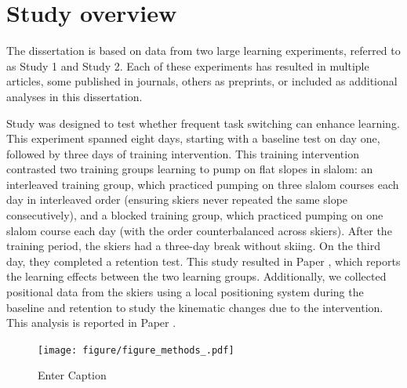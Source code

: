 \newcommand{\RNum}[1]{\uppercase\expandafter{\romannumeral #1\relax}}

\section{Study overview}
The dissertation is based on data from two large learning experiments, referred to as Study 1 and Study 2. Each of these experiments has resulted in multiple articles, some published in journals, others as preprints, or included as additional analyses in this dissertation. 

Study \RNum{1} was designed to test whether frequent task switching can enhance learning. This experiment spanned eight days, starting with a baseline test on day one, followed by three days of training intervention. This training intervention contrasted two training groups learning to pump on flat slopes in slalom: an interleaved training group, which practiced pumping on three slalom courses each day in interleaved order (ensuring skiers never repeated the same slope consecutively), and a blocked training group, which practiced pumping on one slalom course each day (with the order counterbalanced across skiers). After the training period, the skiers had a three-day break without skiing. On the third day, they completed a retention test. This study resulted in Paper \RNum{1}, which reports the learning effects between the two learning groups. Additionally, we collected positional data from the skiers using a local positioning system during the baseline and retention to study the kinematic changes due to the intervention. This analysis is reported in Paper \RNum{2}. 

\begin{figure}
    \centering
    \texttt{[image: figure/figure\_methods\_.pdf]}
    \caption{Enter Caption}
    \label{fig: ci_illustration}
\end{figure}


